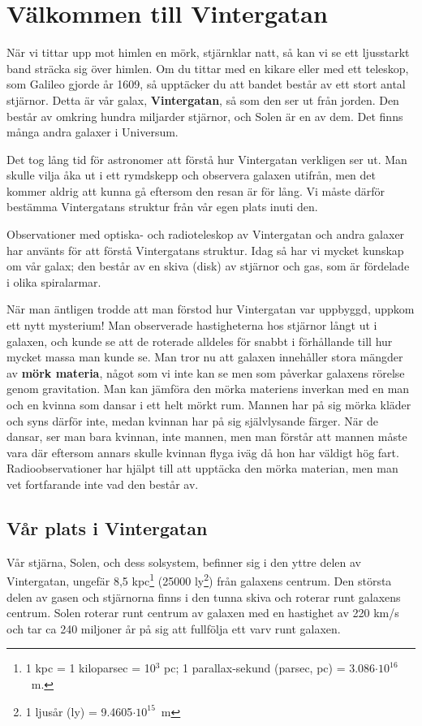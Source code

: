 \chapter{Välkommen till Vintergatan}

När vi tittar upp mot himlen en mörk, stjärnklar natt, så kan vi se ett 
ljusstarkt band sträcka sig över himlen. Om du tittar med en kikare eller
med ett teleskop, som Galileo gjorde år 1609, så upptäcker du att bandet
består av ett stort antal stjärnor. Detta är vår galax, {\bf Vintergatan},
så som den ser ut från jorden. Den består av omkring hundra miljarder
stjärnor, och Solen är en av dem. Det finns många andra galaxer i Universum.

Det tog lång tid för astronomer att förstå hur Vintergatan verkligen ser ut.
Man skulle vilja åka ut i ett rymdskepp och observera galaxen utifrån, men det
kommer aldrig att kunna gå eftersom den resan är för lång.  Vi måste därför
bestämma Vintergatans struktur från vår egen plats inuti den. 

Observationer med optiska- och radioteleskop av Vintergatan och andra galaxer
har använts för att förstå Vintergatans struktur. Idag så har vi mycket kunskap
om vår galax; den består av en skiva (disk) av stjärnor och gas, som är
fördelade i olika spiralarmar.

När man äntligen trodde att man förstod hur Vintergatan var uppbyggd, uppkom
ett nytt mysterium! Man observerade hastigheterna hos stjärnor långt ut i
galaxen, och kunde se att de roterade alldeles för snabbt i förhållande till
hur mycket massa man kunde se. Man tror nu att galaxen innehåller stora mängder
av {\bf mörk materia}, något som vi inte kan se men som påverkar galaxens
rörelse genom gravitation. Man kan jämföra den mörka materiens inverkan med en
man och en kvinna som dansar i ett helt mörkt rum. Mannen har på sig mörka
kläder och syns därför inte, medan kvinnan har på sig självlysande färger. När
de dansar, ser man bara kvinnan, inte mannen, men man förstår att mannen måste
vara där eftersom annars skulle kvinnan flyga iväg då hon har väldigt hög fart.
Radioobservationer har hjälpt till att upptäcka den mörka materian, men man vet
fortfarande inte vad den består av.

\vfill\eject
\section{Vår plats i Vintergatan}
Vår stjärna, Solen, och dess solsystem, befinner sig i den yttre delen av
Vintergatan, ungefär 8,5 kpc\footnote{1 kpc = 1 kiloparsec = 10$^3$ pc; 1
parallax-sekund (parsec, pc) = 3.086$\cdot 10^{16}$~m.}  (25000 ly\footnote{1
ljusår (ly) = 9.4605$\cdot 10^{15}$~m}) från galaxens centrum. Den största
delen av gasen och stjärnorna finns i den tunna skiva och roterar runt galaxens
centrum. Solen roterar runt centrum av galaxen med en hastighet av 220 km/s och
tar ca 240 miljoner år på sig att fullfölja ett varv runt galaxen.

